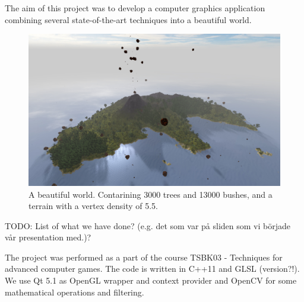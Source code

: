 The aim of this project was to develop a computer graphics application combining several state-of-the-art techniques into a beautiful world. 
\begin{figure}[H]
  \centering
  \includegraphics[width=1.0\linewidth]{images/frontImage.jpg}
  \caption{A beautiful world. Contarining 3000 trees and 13000 bushes, and a terrain with a vertex density of 5.5.}
  \label{fig:beautifulIsland}
\end{figure}%

TODO: List of what we have done? (e.g. det som var på sliden som vi började vår presentation med.)?


The project was performed as a part of the course TSBK03 - Techniques for advanced computer games. The code is written in C++11 and GLSL (version?!). We use Qt 5.1 as OpenGL wrapper and context provider and OpenCV for some mathematical operations and filtering.